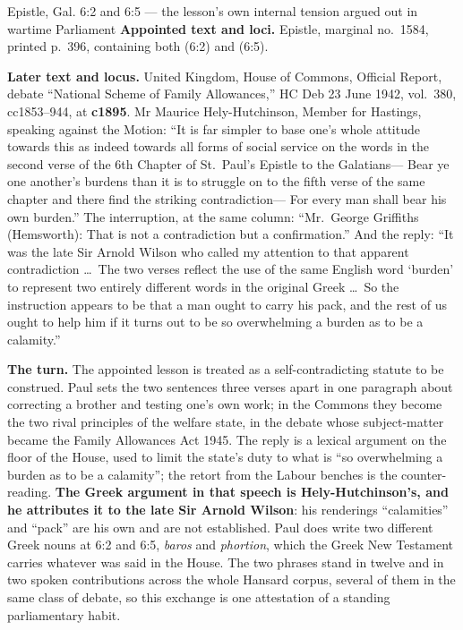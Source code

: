 \begin{afterlife}{Epistle, Gal. 6:2 and 6:5 --- the lesson's own internal tension argued out in wartime Parliament}
\textbf{Appointed text and loci.} Epistle, marginal no.~1584, printed p.~396,
containing both  (6:2) and  (6:5).

\textbf{Later text and locus.} United Kingdom, House of Commons, Official Report,
debate ``National Scheme of Family Allowances,'' HC Deb 23 June 1942, vol.~380,
cc1853--944, at \textbf{c1895}. Mr Maurice Hely-Hutchinson, Member for Hastings,
speaking against the Motion: ``It is far simpler to base one's whole attitude
towards this as indeed towards all forms of social service on the words in the
second verse of the 6th Chapter of St.\ Paul's Epistle to the Galatians--- Bear ye
one another's burdens than it is to struggle on to the fifth verse of the same
chapter and there find the striking contradiction--- For every man shall bear his
own burden.'' The interruption, at the same column: ``Mr.\ George Griffiths
(Hemsworth): That is not a contradiction but a confirmation.'' And the reply: ``It
was the late Sir Arnold Wilson who called my attention to that apparent
contradiction \dots\ The two verses reflect the use of the same English word
`burden' to represent two entirely different words in the original Greek \dots\ So
the instruction appears to be that a man ought to carry his pack, and the rest of
us ought to help him if it turns out to be so overwhelming a burden as to be a
calamity.''

\textbf{The turn.} The appointed lesson is treated as a self-contradicting statute
to be construed. Paul sets the two sentences three verses apart in one paragraph
about correcting a brother and testing one's own work; in the Commons they become
the two rival principles of the welfare state, in the debate whose subject-matter
became the Family Allowances Act 1945. The reply is a lexical argument on the floor of the House, used to limit
the state's duty to what is ``so overwhelming a burden as to be a calamity''; the
retort from the Labour benches is the counter-reading. \textbf{The Greek argument
in that speech is Hely-Hutchinson's, and he attributes it to the late Sir Arnold
Wilson}: his renderings ``calamities'' and ``pack'' are his own and are not
established. Paul does write two different Greek nouns at 6:2 and 6:5,
\emph{baros} and \emph{phortion}, which the Greek New Testament carries whatever
was said in the House. The two phrases stand in twelve and in two spoken
contributions across the whole Hansard corpus, several of them in the same class
of debate, so this exchange is one attestation of a standing parliamentary
habit.
\end{afterlife}

